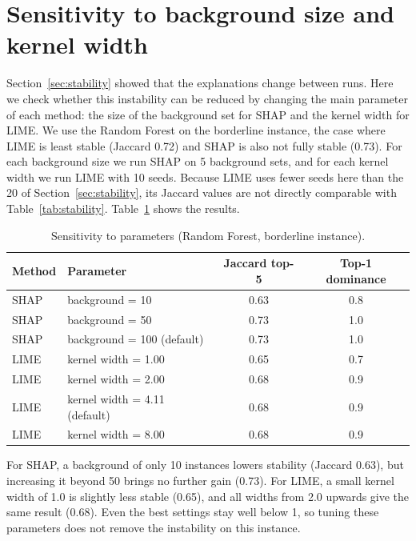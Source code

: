 \documentclass[11pt,a4paper]{article}
\begin{document}
\section{Sensitivity to background size and kernel width}\label{app:sensitivity}
Section~\ref{sec:stability} showed that the explanations change between runs.
Here we check whether this instability can be reduced by changing the main
parameter of each method: the size of the background set for SHAP and the
kernel width for LIME. We use the Random Forest on the borderline instance,
the case where LIME is least stable (Jaccard 0.72) and SHAP is also not fully stable (0.73). For each background size
we run SHAP on 5 background sets, and for each kernel width we run LIME with
10 seeds. Because LIME uses fewer seeds here than the 20 of
Section~\ref{sec:stability}, its Jaccard values are not directly comparable
with Table~\ref{tab:stability}. Table~\ref{tab:sensitivity} shows the results.

\begin{table}[!htb]
\centering\small
\caption{Sensitivity to parameters (Random Forest, borderline instance).}\label{tab:sensitivity}
\begin{tabular}{llcc}
\toprule
\textbf{Method} & \textbf{Parameter} & \textbf{Jaccard top-5} & \textbf{Top-1 dominance}\\
\midrule
SHAP & background = 10 & 0.63 & 0.8\\
SHAP & background = 50 & 0.73 & 1.0\\
SHAP & background = 100 (default) & 0.73 & 1.0\\
LIME & kernel width = 1.00 & 0.65 & 0.7\\
LIME & kernel width = 2.00 & 0.68 & 0.9\\
LIME & kernel width = 4.11 (default) & 0.68 & 0.9\\
LIME & kernel width = 8.00 & 0.68 & 0.9\\
\bottomrule
\end{tabular}
\end{table}

For SHAP, a background of only 10 instances lowers stability (Jaccard 0.63),
but increasing it beyond 50 brings no further gain (0.73). For LIME, a small
kernel width of 1.0 is slightly less stable (0.65), and all widths from 2.0
upwards give the same result (0.68). Even the best settings stay well below 1,
so tuning these parameters does not remove the instability on this instance.
\end{document}
